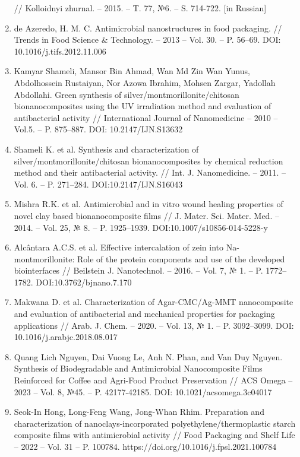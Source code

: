\begin{references}
\begin{enumerate}
  // Kolloidnyi zhurnal. -- 2015. -- T. 77, №6. -- S. 714-722. {[}in
  Russian{]}
\item
  de Azeredo, H. M. C. Antimicrobial nanostructures in food packaging.
  // Trends in Food Science \& Technology. -- 2013 -- Vol. 30. -- P.
  56--69. DOI: 10.1016/j.tifs.2012.11.006
\item
  Kamyar Shameli, Mansor Bin Ahmad, Wan Md Zin Wan Yunus, Abdolhossein
  Rustaiyan, Nor Azowa Ibrahim, Mohsen Zargar, Yadollah Abdollahi. Green
  synthesis of silver/montmorillonite/chitosan bionanocomposites using
  the UV irradiation method and evaluation of antibacterial activity //
  International Journal of Nanomedicine -- 2010 -- Vol.5. -- P.
  875--887. DOI: 10.2147/IJN.S13632
\item
  Shameli K. et al. Synthesis and characterization of
  silver/montmorillonite/chitosan bionanocomposites by chemical
  reduction method and their antibacterial activity. // Int. J.
  Nanomedicine. -- 2011. -- Vol. 6. -- P. 271--284.
  DOI:10.2147/IJN.S16043
\item
  Mishra R.K. et al. Antimicrobial and in vitro wound healing properties
  of novel clay based bionanocomposite films // J. Mater. Sci. Mater.
  Med. -- 2014. -- Vol. 25, № 8. -- P. 1925--1939.
  DOI:10.1007/s10856-014-5228-y
\item
  Alcântara A.C.S. et al. Effective intercalation of zein into
  Na-montmorillonite: Role of the protein components and use of the
  developed biointerfaces // Beilstein J. Nanotechnol. -- 2016. -- Vol.
  7, № 1. -- P. 1772--1782. DOI:10.3762/bjnano.7.170
\item
  Makwana D. et al. Characterization of Agar-CMC/Ag-MMT nanocomposite
  and evaluation of antibacterial and mechanical properties for
  packaging applications // Arab. J. Chem. -- 2020. -- Vol. 13, № 1. --
  P. 3092--3099. DOI: 10.1016/j.arabjc.2018.08.017
\item
  Quang Lich Nguyen, Dai Vuong Le, Anh N. Phan, and Van Duy Nguyen.
  Synthesis of Biodegradable and Antimicrobial Nanocomposite Films
  Reinforced for Coffee and Agri-Food Product Preservation // ACS Omega
  -- 2023 -- Vol. 8, №45. -- P. 42177-42185. DOI:
  10.1021/acsomega.3c04017
\item
  Seok-In Hong, Long-Feng Wang, Jong-Whan Rhim. Preparation and
  characterization of nanoclays-incorporated polyethylene/thermoplastic
  starch composite films with antimicrobial activity // Food Packaging
  and Shelf Life -- 2022 -- Vol. 31 -- P. 100784.
  https://doi.org/10.1016/j.fpsl.2021.100784

\end{enumerate}
\end{references}

